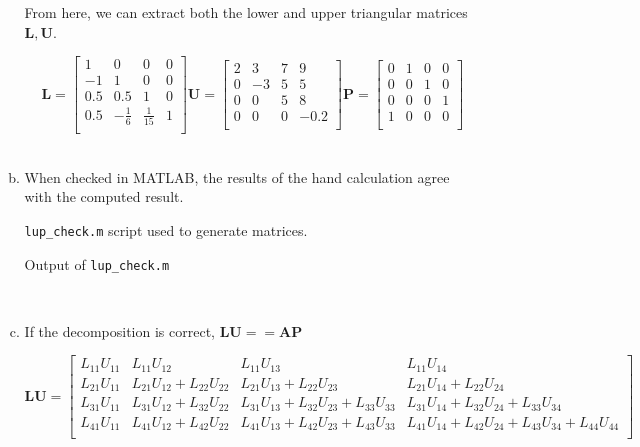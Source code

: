\documentclass[11pt]{article}
\begin{document}
\begin{enumerate}
\begin{enumerate}[(a)]
				From here, we can extract both the lower and upper triangular matrices $\mathbf{L, U}$.

				\[
					\mathbf{L}=
					\begin{bmatrix}
						1 & 0 & 0 & 0 \\
						-1 & 1 & 0 & 0 \\
						0.5 & 0.5 & 1 & 0 \\
						0.5 & -\frac{1}{6} & \frac{1}{15} & 1 \\
					\end{bmatrix}
					\mathbf{U}=
					\begin{bmatrix}
						2 & 3 & 7 & 9 \\
						0 & -3 & 5 & 5 \\
						0 & 0 & 5 & 8 \\
						0 & 0 & 0 & -0.2 \\
					\end{bmatrix}
					\mathbf{P}=
					\begin{bmatrix}
						0 & 1 & 0 & 0 \\
						0 & 0 & 1 & 0 \\
						0 & 0 & 0 & 1 \\
						1 & 0 & 0 & 0 \\
					\end{bmatrix}
				\] \\

			\item When checked in MATLAB, the results of the hand calculation agree with the computed result.

				\begin{center}
					\texttt{lup\_check.m} script used to generate matrices.
				\end{center}
				

				\begin{center}
					Output of \texttt{lup\_check.m}
				\end{center}
				 \

			\item If the decomposition is correct, $\mathbf{LU == AP}$

				\[
					\mathbf{LU}=
					\begin{bmatrix}
						L_{11}U_{11} & L_{11}U_{12} & L_{11}U_{13} & L_{11}U_{14} \\
						L_{21}U_{11} & L_{21}U_{12} + L_{22}U_{22} & L_{21}U_{13} + L_{22}U_{23} &
						L_{21}U_{14} + L_{22}U_{24} \\
						L_{31}U_{11} & L_{31}U_{12} + L_{32}U_{22} & L_{31}U_{13} + L_{32}U_{23} + L_{33}U_{33} &
						L_{31}U_{14} + L_{32}U_{24} + L_{33}U_{34} \\
						L_{41}U_{11} & L_{41}U_{12} + L_{42}U_{22} & L_{41}U_{13} + L_{42}U_{23} + L_{43}U_{33} &
						L_{41}U_{14} + L_{42}U_{24} + L_{43}U_{34} + L_{44}U_{44} \\
					\end{bmatrix}
				\]


\end{enumerate}
\end{enumerate}
\end{document}
